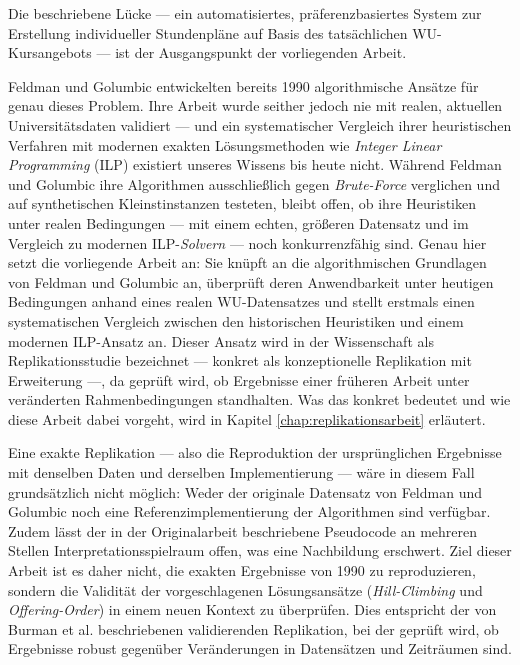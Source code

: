 Die beschriebene Lücke --- ein automatisiertes, präferenzbasiertes System zur Erstellung individueller Stundenpläne auf Basis des tatsächlichen WU-Kursangebots --- ist der Ausgangspunkt der vorliegenden Arbeit.




Feldman und Golumbic \cite{feldmangolumbic} entwickelten bereits 1990 algorithmische Ansätze für genau dieses Problem. Ihre Arbeit wurde seither jedoch nie mit realen, aktuellen Universitätsdaten validiert --- und ein systematischer Vergleich ihrer heuristischen Verfahren mit modernen exakten Lösungsmethoden wie \textit{Integer Linear Programming} (ILP) existiert unseres Wissens bis heute nicht. Während Feldman und Golumbic ihre Algorithmen ausschließlich gegen \textit{Brute-Force} verglichen und auf synthetischen Kleinstinstanzen testeten, bleibt offen, ob ihre Heuristiken unter realen Bedingungen --- mit einem echten, größeren Datensatz und im Vergleich zu modernen ILP-\textit{Solvern} --- noch konkurrenzfähig sind. Genau hier setzt die vorliegende Arbeit an: Sie knüpft an die algorithmischen Grundlagen von Feldman und Golumbic \cite{feldmangolumbic} an, überprüft deren Anwendbarkeit unter heutigen Bedingungen anhand eines realen WU-Datensatzes und stellt erstmals einen systematischen Vergleich zwischen den historischen Heuristiken und einem modernen ILP-Ansatz an. Dieser Ansatz wird in der Wissenschaft als Replikationsstudie bezeichnet --- konkret als konzeptionelle Replikation mit Erweiterung ---, da geprüft wird, ob Ergebnisse einer früheren Arbeit unter veränderten Rahmenbedingungen standhalten. Was das konkret bedeutet und wie diese Arbeit dabei vorgeht, wird in Kapitel \ref{chap:replikationsarbeit} erläutert.




Eine exakte Replikation --- also die Reproduktion der ursprünglichen Ergebnisse mit denselben Daten und derselben Implementierung --- wäre in diesem Fall grundsätzlich nicht möglich: Weder der originale Datensatz von Feldman und Golumbic noch eine Referenzimplementierung der Algorithmen sind verfügbar. Zudem lässt der in der Originalarbeit beschriebene Pseudocode an mehreren Stellen Interpretationsspielraum offen, was eine Nachbildung erschwert. Ziel dieser Arbeit ist es daher nicht, die exakten Ergebnisse von 1990 zu reproduzieren, sondern die Validität der vorgeschlagenen Lösungsansätze (\textit{Hill-Climbing} und \textit{Offering-Order}) in einem neuen Kontext zu überprüfen. Dies entspricht der von Burman et al. \cite{burman-2010} beschriebenen validierenden Replikation, bei der geprüft wird, ob Ergebnisse robust gegenüber Veränderungen in Datensätzen und Zeiträumen sind.


